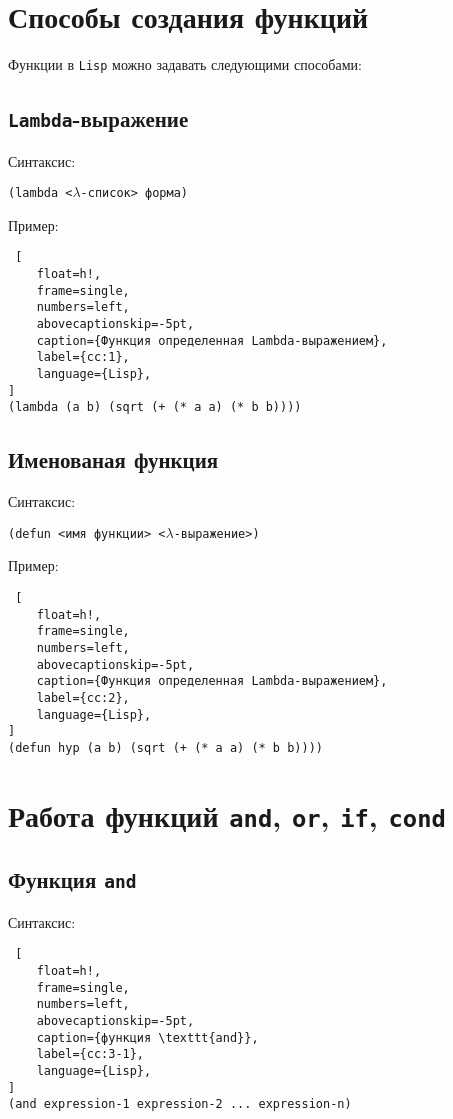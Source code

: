 \section{Способы создания функций}

Функции в \texttt{Lisp} можно задавать следующими способами:

\subsection*{\texttt{Lambda}-выражение}

Синтаксис:

\texttt{(lambda <$\lambda$-список> форма)}

Пример:

\begin{lstlisting} [
	float=h!,
	frame=single,
	numbers=left,
	abovecaptionskip=-5pt,
	caption={Функция определенная Lambda-выражением},
	label={cc:1},
	language={Lisp},
]
(lambda (a b) (sqrt (+ (* a a) (* b b))))
\end{lstlisting}

\subsection*{Именованая функция}

Синтаксис:

\texttt{(defun <имя функции> <$\lambda$-выражение>)}

Пример:

\begin{lstlisting} [
	float=h!,
	frame=single,
	numbers=left,
	abovecaptionskip=-5pt,
	caption={Функция определенная Lambda-выражением},
	label={cc:2},
	language={Lisp},
]
(defun hyp (a b) (sqrt (+ (* a a) (* b b))))
\end{lstlisting}

\section{Работа функций \texttt{and}, \texttt{or}, \texttt{if}, \texttt{cond}}

\subsection{Функция \texttt{and}}

Синтаксис:
\begin{lstlisting} [
	float=h!,
	frame=single,
	numbers=left,
	abovecaptionskip=-5pt,
	caption={функция \texttt{and}},
	label={сс:3-1},
	language={Lisp},
]
(and expression-1 expression-2 ... expression-n)
\end{lstlisting}

